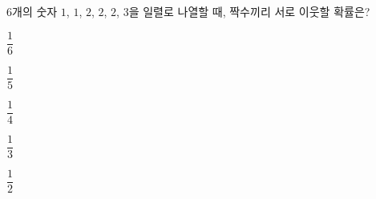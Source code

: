 $6$개의 숫자 $1$, $1$, $2$, $2$, $2$, $3$을 일렬로 나열할 때, 짝수끼리 서로 이웃할 확률은?
\begin{choices32}{\rule[-3ex]{0pt}{8ex}$\dfrac{1}{6}$}{\rule[-3ex]{0pt}{8ex}$\dfrac{1}{5}$}{\rule[-3ex]{0pt}{8ex}$\dfrac{1}{4}$}{\rule[-3ex]{0pt}{8ex}$\dfrac{1}{3}$}{\rule[-3ex]{0pt}{8ex}$\dfrac{1}{2}$}\end{choices32}
